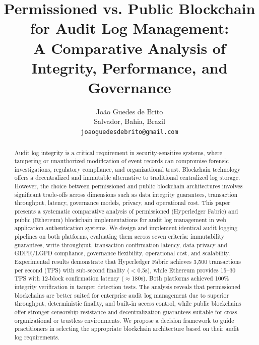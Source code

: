 \documentclass[12pt,a4paper]{article}
\begin{document}
\title{\textbf{Permissioned vs. Public Blockchain for Audit Log Management:\\ A Comparative Analysis of Integrity, Performance, and Governance}}

\author{João Guedes de Brito\\
\small Salvador, Bahia, Brazil\\
\small \texttt{joaoguedesdebrito@gmail.com}}

\date{}

\maketitle

\begin{abstract}
Audit log integrity is a critical requirement in security-sensitive systems, where tampering or unauthorized modification of event records can compromise forensic investigations, regulatory compliance, and organizational trust. Blockchain technology offers a decentralized and immutable alternative to traditional centralized log storage. However, the choice between permissioned and public blockchain architectures involves significant trade-offs across dimensions such as data integrity guarantees, transaction throughput, latency, governance models, privacy, and operational cost. This paper presents a systematic comparative analysis of permissioned (Hyperledger Fabric) and public (Ethereum) blockchain implementations for audit log management in web application authentication systems. We design and implement identical audit logging pipelines on both platforms, evaluating them across seven criteria: immutability guarantees, write throughput, transaction confirmation latency, data privacy and GDPR/LGPD compliance, governance flexibility, operational cost, and scalability. Experimental results demonstrate that Hyperledger Fabric achieves 3,500 transactions per second (TPS) with sub-second finality ($<$0.5s), while Ethereum provides 15--30 TPS with 12-block confirmation latency ($\approx$180s). Both platforms achieved 100\% integrity verification in tamper detection tests. The analysis reveals that permissioned blockchains are better suited for enterprise audit log management due to superior throughput, deterministic finality, and built-in access control, while public blockchains offer stronger censorship resistance and decentralization guarantees suitable for cross-organizational or trustless environments. We propose a decision framework to guide practitioners in selecting the appropriate blockchain architecture based on their audit log requirements.
\end{abstract}
\end{document}
